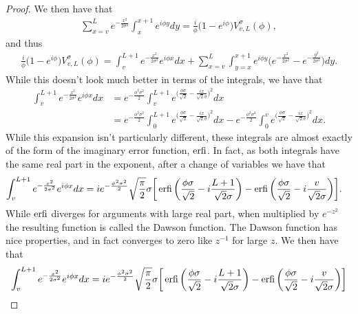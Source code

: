 \documentclass[../thesis-main/thesis-main]{subfiles}
\begin{document}
\begin{proof}
 We then have that 
\begin{align}
  \sum_{x=v}^L e^{-\frac{x^2}{2\sigma^2}} \int_{x}^{x+1} e^{i\phi y} dy = \frac{i}{\phi}\big( 1 - e^{i\phi}\big) V_{v,L}^\sigma (\phi),
\end{align}
and thus
\begin{align}
  \frac{i}{\phi} \big(1 - e^{i\phi}\big) V_{v,L}^\sigma(\phi) = \int_{v}^{L+1} e^{-\frac{x^2}{2\sigma^2}} e^{i \phi x} dx + \sum_{x=v}^{L} \int_{y=x}^{x+1} e^{i\phi y} \big(e^{-\frac{x^2}{2\sigma^2}} - e^{-\frac{y^2}{2\sigma^2}} \big)dy.
\end{align}
While this doesn't look much better in terms of the integrals, we have that
\begin{align}
  \int_{v}^{L+1} e^{-\frac{x^2}{2\sigma^2}}e^{i \phi x} dx 
  &= e^{-\frac{\phi^2\sigma^2}{2}} \int_{v}^{L+1} e^{\big(\frac{\phi \sigma}{\sqrt{2}} - \frac{i x}{\sqrt{2}\sigma} \big)^2} dx\\
 & =  e^{-\frac{\phi^2\sigma^2}{2}} \int_{0}^{L+1} e^{\big(\frac{\phi \sigma}{\sqrt{2}} - \frac{i x}{\sqrt{2}\sigma} \big)^2} dx
    - e^{-\frac{\phi^2\sigma^2}{2}} \int_{0}^{v} e^{\big(\frac{\phi \sigma}{\sqrt{2}} - \frac{i x}{\sqrt{2}\sigma} \big)^2} dx.
\end{align}
While this expansion isn't particularly different, these integrals are almost exactly of the form of the imaginary error function, $\operatorname{erfi}$.  In fact, as both integrals have the same real part in the exponent, after a change of variables we have that
\begin{align}
  \int_{v}^{L+1} e^{-\frac{x^2}{2\sigma^2}}e^{i \phi x} dx 
    &=i e^{-\frac{\phi^2\sigma^2}{2}} \sqrt{\frac{\pi}{2}} \sigma \bigg[\operatorname{erfi} \bigg(\frac{\phi \sigma}{\sqrt{2}} -i  \frac{L+1}{\sqrt{2} \sigma} \bigg) - \operatorname{erfi}\bigg(\frac{\phi \sigma}{\sqrt{2}} -i  \frac{v}{\sqrt{2} \sigma} \bigg)\bigg].
\end{align}
While $\operatorname{erfi}$ diverges for arguments with large real part, when multiplied by $e^{-z^2}$ the resulting function is called the Dawson function.  The Dawson function has nice properties, and in fact converges to zero like $z^{-1}$ for large $z$.  We then have that
\begin{align}
  \int_{v}^{L+1} e^{-\frac{x^2}{2\sigma^2}}e^{i \phi x} dx 
    &=i e^{-\frac{\phi^2\sigma^2}{2}} \sqrt{\frac{\pi}{2}} \sigma \bigg[\erfi \bigg(\frac{\phi \sigma}{\sqrt{2}} -i  \frac{L+1}{\sqrt{2} \sigma} \bigg) - \erfi\bigg(\frac{\phi \sigma}{\sqrt{2}} -i  \frac{v}{\sqrt{2} \sigma} \bigg)\bigg]\\

\end{align}
\end{proof}
\end{document}
